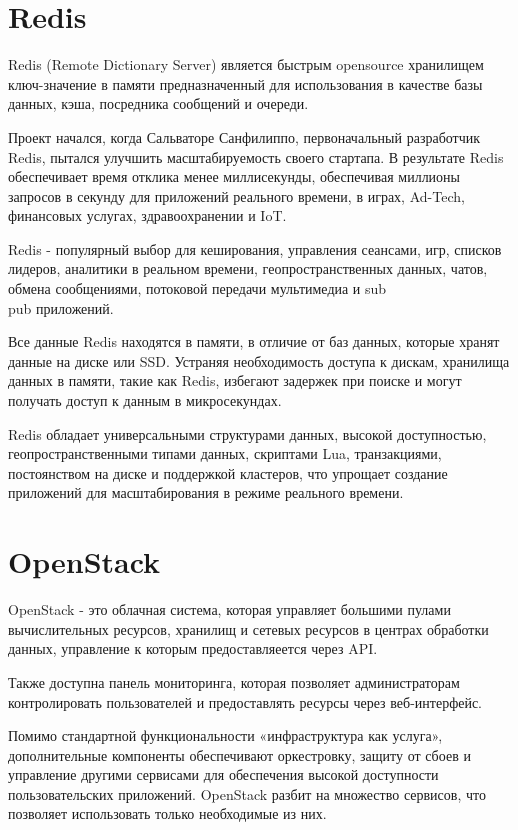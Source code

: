 \section{Redis}\label{sec:ch3/sect5}
Redis (Remote Dictionary Server) является быстрым opensource хранилищем ключ-значение в памяти предназначенный для использования в качестве базы данных, кэша, посредника сообщений и очереди.


Проект начался, когда Сальваторе Санфилиппо, первоначальный разработчик Redis, пытался улучшить масштабируемость своего стартапа. В результате Redis обеспечивает время отклика менее миллисекунды, обеспечивая миллионы запросов в секунду для приложений реального времени, в играх, Ad-Tech, финансовых услугах, здравоохранении и IoT.


Redis - популярный выбор для кеширования, управления сеансами, игр, списков лидеров, аналитики в реальном времени, геопространственных данных, чатов, обмена сообщениями, потоковой передачи мультимедиа и sub\\pub приложений.


Все данные Redis находятся в памяти, в отличие от баз данных, которые хранят данные на диске или SSD. Устраняя необходимость доступа к дискам, хранилища данных в памяти, такие как Redis, избегают задержек при поиске и могут получать доступ к данным в микросекундах.

Redis обладает универсальными структурами данных, высокой доступностью, геопространственными типами данных, скриптами Lua, транзакциями, постоянством на диске и поддержкой кластеров, что упрощает создание приложений для масштабирования в режиме реального времени.

\section{OpenStack}\label{sec:ch3/sect6}
OpenStack - это облачная система, которая управляет большими пулами вычислительных ресурсов, хранилищ и сетевых ресурсов в центрах обработки данных, управление к которым предоставляеется через API.

Также доступна панель мониторинга, которая позволяет администраторам контролировать пользователей и предоставлять ресурсы через веб-интерфейс.


Помимо стандартной функциональности «инфраструктура как услуга», дополнительные компоненты обеспечивают оркестровку, защиту от сбоев и управление другими сервисами для обеспечения высокой доступности пользовательских приложений.
OpenStack разбит на множество сервисов, что позволяет использовать только необходимые из них.



